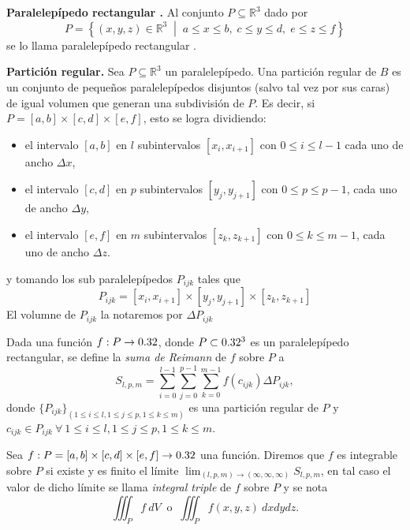 \begin{definition} \textbf{Paralelepípedo rectangular .}  Al conjunto $P  \subseteq  \mathbb{R}^3$ dado por
\[
P = \left\{ (x, y, z) \in \mathbb{R}^3 \;\middle|\; a \leq x \leq b,\; c \leq y \leq d,\; e \leq z \leq f \right\}
\] 
se lo llama paralelepípedo rectangular . 
\end{definition}


\begin{definition} \textbf{Partici\'on regular.} 	Sea \( P  \subseteq  \mathbb{R}^3 \) un paralelepípedo.  Una partición regular de $B$ es un conjunto de pequeños paralelepípedos disjuntos (salvo tal vez por sus caras)  de igual volumen que  generan una subdivisi\'on de $P$.  Es decir, si $P = [a, b] \times [c, d] \times [e, f]$,  esto se logra dividiendo:

\begin{itemize}
    \item el intervalo \( [a, b] \) en \( l \) subintervalos \( [x_i, x_{i+1}] \)  con $0 \leq  i \leq l-1$ cada uno de ancho \( \Delta x \),
    \item el intervalo \( [c, d] \) en \( p \) subintervalos \( [y_j, y_{j+1}] \)  con $0 \leq  p \leq p-1$, cada uno de ancho \( \Delta y \),
    \item el intervalo \( [e, f] \) en \( m \) subintervalos \( [z_k, z_{k+1}] \)  con $0 \leq  k \leq m-1$, cada uno de ancho \( \Delta z \).
\end{itemize}
y tomando los sub paralelepípedos $P_{ijk}$ tales que
	\[
	P_{ijk} = [x_i, x_{i+1}] \times [y_j, y_{j+1}] \times [z_k, z_{k+1}]
	\]  El volumne de $ P_{ijk}$ la notaremos por $\Delta P_{ijk}$ 
\end{definition}


%


\begin{definition}
Dada una funci\'on $f:P\to0.32$, donde $P\subset 0.32^3$ es un paralelep\'ipedo rectangular, se define la \emph{suma de Reimann}  de $f$ sobre $P$ a
\[
    S_{l,p,m}=\sum_{i=0}^{l-1}\sum_{j=0}^{p-1}\sum_{k=0}^{m-1}f(c_{ijk})\Delta P_{ijk},
\]  
donde $\{ P_{ijk}\}_{( 1 \leq i \leq l, 1 \leq j \leq p, 1 \leq k \leq m  )}$ es una partici\'on regular de $P$ y  $c_{ijk}\in P_{ijk}  \: \forall \: 1 \leq i \leq l, 1 \leq j \leq p, 1 \leq k \leq m.$ 
\end{definition}

\begin{definition} 
Sea $f: P=[a,b]\times[c,d]\times[e,f] \to0.32$ una funci\'on.    Diremos que $f$ es integrable sobre $P$ si existe y es finito el  l\'imite $\lim_{(l,p,m)\to(\infty,\infty,\infty)} S_{l,p,m}$, en tal caso  el valor de dicho l\'imite  se llama \emph{integral triple} de $f$ sobre $P$ y se nota 
    \[
          \iiint_P f\:dV  \: \mbox{ o } \:  \iiint_P f(x,y,z)\:dxdydz.
    \]
\end{definition}






